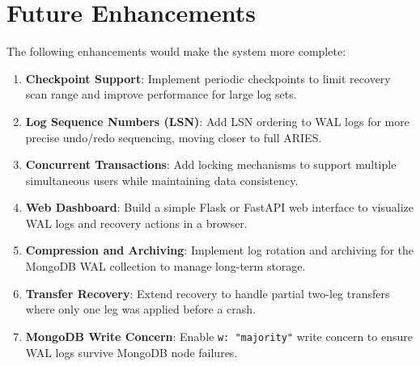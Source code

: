 \section{Future Enhancements}

The following enhancements would make the system more complete:

\begin{enumerate}
  \item \textbf{Checkpoint Support}: Implement periodic checkpoints to
        limit recovery scan range and improve performance for large log sets.

  \item \textbf{Log Sequence Numbers (LSN)}: Add LSN ordering to WAL logs
        for more precise undo/redo sequencing, moving closer to full ARIES.

  \item \textbf{Concurrent Transactions}: Add locking mechanisms to support
        multiple simultaneous users while maintaining data consistency.

  \item \textbf{Web Dashboard}: Build a simple Flask or FastAPI web interface
        to visualize WAL logs and recovery actions in a browser.

  \item \textbf{Compression and Archiving}: Implement log rotation and
        archiving for the MongoDB WAL collection to manage long-term storage.

  \item \textbf{Transfer Recovery}: Extend recovery to handle partial
        two-leg transfers where only one leg was applied before a crash.

  \item \textbf{MongoDB Write Concern}: Enable \texttt{w: "majority"} write
        concern to ensure WAL logs survive MongoDB node failures.
\end{enumerate}

